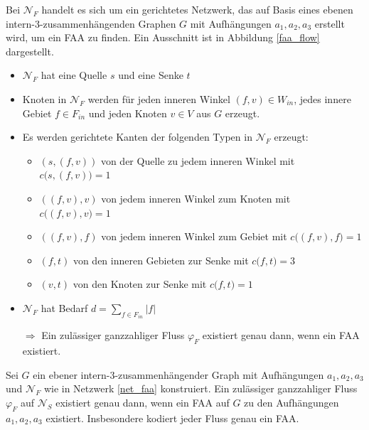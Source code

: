 \begin{network}[FAA]\label{net_faa}
Bei $\mathcal{N}_F$ handelt es sich um ein gerichtetes Netzwerk, das auf Basis eines ebenen intern-3-zusammenhängenden Graphen $G$ mit Aufhängungen $a_1,a_2,a_3$ erstellt wird, um ein FAA zu finden. Ein Ausschnitt ist in Abbildung \ref{faa_flow} dargestellt.
	\begin{itemize}
	\item $\mathcal{N}_F$ hat eine Quelle $s$ und eine Senke $t$
	\item Knoten in $\mathcal{N}_F$ werden für jeden inneren Winkel $(f,v) \in W_{in}$, jedes innere Gebiet $f\in F_{in}$ und jeden Knoten $v \in V$ aus $G$ erzeugt.
	\item Es werden gerichtete Kanten der folgenden Typen in $\mathcal{N}_F$ erzeugt:
		\begin{itemize}
		\item $(s,(f,v))$ von der Quelle zu jedem inneren Winkel mit $c\big(s,(f,v)\big) = 1$
		\item $((f,v),v)$ von jedem inneren Winkel zum Knoten mit $c\big((f,v),v\big) = 1$
		\item $((f,v),f)$ von jedem inneren Winkel zum Gebiet mit $c\big((f,v),f\big) = 1$
		\item $(f,t)$ von den inneren Gebieten zur Senke mit $c\big(f,t\big) = 3$
		\item $(v,t)$ von den Knoten zur Senke mit $c\big(f,t\big) = 1$
		\end{itemize}
	\item $\mathcal{N}_F$ hat Bedarf $d=\sum_{f \in F_{in}}|f|$
	\item [$\Rightarrow$]Ein zulässiger ganzzahliger Fluss $\varphi_F$ existiert genau dann, wenn ein FAA existiert.
	\end{itemize}
\end{network}

\begin{proposition}\label{prop_net_faa}
Sei $G$ ein ebener intern-3-zusammenhängender Graph mit Aufhängungen $a_1,a_2,a_3$ und $\mathcal{N}_F$ wie in Netzwerk \ref{net_faa} konstruiert. Ein zulässiger ganzzahliger Fluss $\varphi_F$ auf $\mathcal{N}_S$ existiert genau dann, wenn ein FAA auf $G$ zu den Aufhängungen $a_1,a_2,a_3$ existiert. Insbesondere kodiert jeder Fluss genau ein FAA.
\end{proposition}

